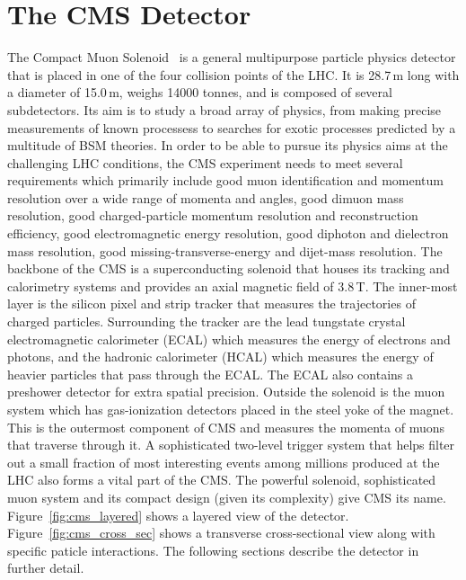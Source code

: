 \section{The CMS Detector}
\label{sec:CMS}
The Compact Muon Solenoid~\cite{cms_exp_ref} is a general multipurpose particle physics detector that is placed in one of the four collision points of the LHC. It is 28.7\,m long with a diameter of 15.0\,m, weighs 14000 tonnes, and is composed of several subdetectors. Its aim is to study a broad array of physics, from making precise measurements of known processess to searches for exotic processes predicted by a multitude of BSM theories. In order to be able to pursue its physics aims at the challenging LHC conditions, the CMS experiment needs to meet several requirements which primarily include good muon identification and momentum resolution over a wide range of momenta and angles, good dimuon mass resolution, good charged-particle momentum resolution and reconstruction efficiency, good electromagnetic energy resolution, good diphoton and dielectron mass resolution, good missing-transverse-energy and dijet-mass resolution.
The backbone of the CMS is a superconducting solenoid that houses its tracking and calorimetry systems and provides an axial magnetic field of 3.8\,T. The inner-most layer is the silicon pixel and strip tracker that measures the trajectories of charged particles. Surrounding the tracker are the lead tungstate crystal electromagnetic calorimeter (ECAL) which measures the energy of electrons and photons, and the hadronic calorimeter (HCAL) which measures the energy of heavier particles that pass through the ECAL. The ECAL also contains a preshower detector for extra spatial precision. Outside the solenoid is the muon system which has gas-ionization detectors placed in the steel yoke of the magnet. This is the outermost component of CMS and measures the momenta of muons that traverse through it. A sophisticated two-level trigger system that helps filter out a small fraction of most interesting events among millions produced at the LHC also forms a vital part of the CMS. The powerful solenoid, sophisticated muon system and its compact design (given its complexity) give CMS its name. Figure~\ref{fig:cms_layered} shows a layered view of the detector. Figure~\ref{fig:cms_cross_sec} shows a transverse cross-sectional view along with specific paticle interactions. The following sections describe the detector in further detail.   

